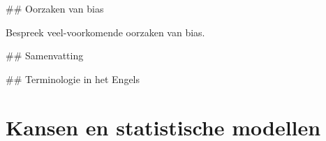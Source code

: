 \documentclass[
  a4paper,
]{scrbook}
\theoremstyle{definition}
\theoremstyle{definition}
\theoremstyle{remark}
\begin{document}
\#\# Oorzaken van bias

Bespreek veel-voorkomende oorzaken van bias.

\#\# Samenvatting

\#\# Terminologie in het Engels

\chapter{Kansen en statistische
modellen}\label{kansen-en-statistische-modellen}

\renewcommand{\ttdefault}{lcmtt}
\providecommand{\ped}[1]{_\textrm{#1}}
\providecommand{\ap}[1]{^\textrm{#1}}
\providecommand{\app}[1]{^\textrm{#1}}

\providecommand*{\angs}{\smash{\mathrm{\ring A}}}
\providecommand*{\celsius}{\mathrm{~\circ C}}
\providecommand*{\micro}{\mu}

\providecommand*{\unit}[1]{\textrm{\,#1}}

\providecommand{\E}{\mathrm{e}}
\providecommand{\I}{\mathrm{i}}
\providecommand{\sfrac}[2]{^{#1}/_{#2}}

\providecommand{\conc}[1]{\left[\mathrm{#1}\right]}

\providecommand{\command}[1]{\textsl{#1}}
\providecommand{\out}[1]{\begin{verbatim}#1\end{verbatim}}

\providecommand{\diff}{\mathrm{d}\,}

\providecommand*{\deriv}[3][]{%
    \frac{\diff^{#1}#2}{\diff #3^{#1}}}
\providecommand*{\pderiv}[3][]{%
    \frac{\partial^{#1}#2}
        {\partial #3^{#1}}}

\renewcommand{\vec}[1]{{\boldsymbol #1}}

\providecommand{\cov}[2]{\mathrm{Cov}\!\left(#1, #2\right)}
\providecommand{\var}[1]{\mathrm{Var}\!\left(#1\right)}

\providecommand{\mean}[1]{\overline{#1}}

\providecommand{\sd}[1]{\sigma\left(#1\right)}
\providecommand{\ev}[1]{\mathbb{E}\!\left(#1\right)}
\providecommand{\pr}[1]{\textrm{Pr}\!\left(#1\right)}

\providecommand{\se}[1]{\mathrm{SE}_{#1}}

\providecommand{\ct}[3]{t_{#1 (#2) #3}}

\providecommand{\HO}{H\ped{0}}
\providecommand{\HA}{H\ped{A}}
\providecommand{\df}{\mathrm{df}}
\end{document}
